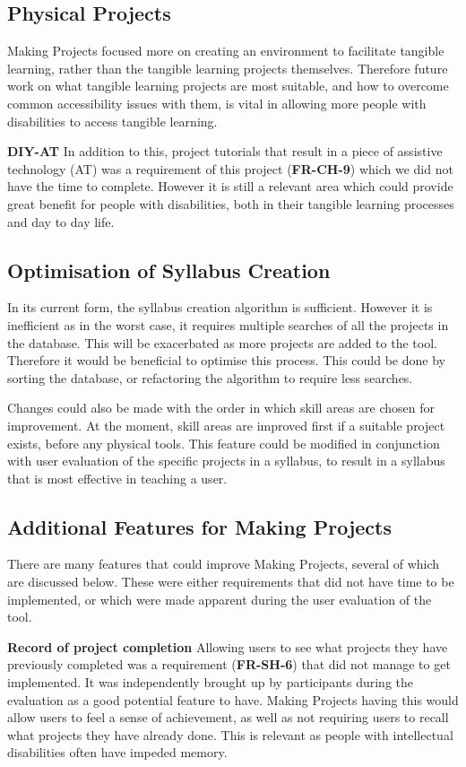 \documentclass{l4proj}
\begin{document}
\subsection{Physical Projects}
Making Projects focused more on creating an environment to facilitate tangible learning, rather than the tangible learning projects themselves. Therefore future work on what tangible learning projects are most suitable, and how to overcome common accessibility issues with them, is vital in allowing more people with disabilities to access tangible learning.   

\textbf{DIY-AT} In addition to this, project tutorials that result in a piece of assistive technology (AT) was a requirement of this project (\textbf{FR-CH-9}) which we did not have the time to complete. However it is still a relevant area which could provide great benefit for people with disabilities, both in their tangible learning processes and day to day life.

\subsection{Optimisation of Syllabus Creation}
In its current form, the syllabus creation algorithm is sufficient. However it is inefficient as in the worst case, it requires multiple searches of all the projects in the database. This will be exacerbated as more projects are added to the tool. Therefore it would be beneficial to optimise this process. This could be done by sorting the database, or refactoring the algorithm to require less searches. 

Changes could also be made with the order in which skill areas are chosen for improvement. At the moment, skill areas are improved first if a suitable project exists, before any physical tools. This feature could be modified in conjunction with user evaluation of the specific projects in a syllabus, to result in a syllabus that is most effective in teaching a user. 

\subsection{Additional Features for Making Projects}
There are many features that could improve Making Projects, several of which are discussed below. These were either requirements that did not have time to be implemented, or which were made apparent during the user evaluation of the tool. 

\textbf{Record of project completion} Allowing users to see what projects they have previously completed was a requirement (\textbf{FR-SH-6}) that did not manage to get implemented. It was independently brought up by participants during the evaluation as a good potential feature to have. Making Projects having this would allow users to feel a sense of achievement, as well as not requiring users to recall what projects they have already done. This is relevant as people with intellectual disabilities often have impeded memory.
\end{document}
